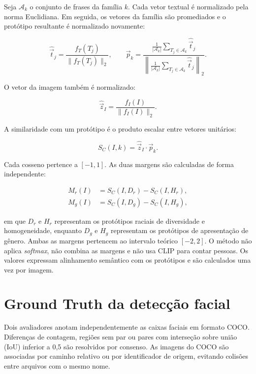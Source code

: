 Seja $\mathcal{A}_k$ o conjunto de frases da família $k$. Cada vetor textual é normalizado pela norma Euclidiana. Em seguida, os vetores da família são promediados e o protótipo resultante é normalizado novamente:

\begin{equation}
\widehat{\vec{t}}_j =
\frac{f_T(T_j)}{\lVert f_T(T_j) \rVert_2},
\qquad
\vec{p}_k =
\frac{\frac{1}{|\mathcal{A}_k|}\sum_{T_j \in \mathcal{A}_k}\widehat{\vec{t}}_j}
{\left\lVert \frac{1}{|\mathcal{A}_k|}\sum_{T_j \in \mathcal{A}_k}\widehat{\vec{t}}_j \right\rVert_2}.
\end{equation}

O vetor da imagem também é normalizado:

\begin{equation}
\widehat{\vec{z}}_I =
\frac{f_I(I)}{\lVert f_I(I) \rVert_2}.
\end{equation}

A similaridade com um protótipo é o produto escalar entre vetores unitários:

\begin{equation}
S_C(I,k) = \widehat{\vec{z}}_I \cdot \vec{p}_k.
\end{equation}

Cada cosseno pertence a $[-1,1]$. As duas margens são calculadas de forma independente:

\begin{align}
M_r(I) &= S_C(I,D_r) - S_C(I,H_r), \\
M_g(I) &= S_C(I,D_g) - S_C(I,H_g),
\end{align}

\noindent em que $D_r$ e $H_r$ representam os protótipos raciais de diversidade e homogeneidade, enquanto $D_g$ e $H_g$ representam os protótipos de apresentação de gênero. Ambas as margens pertencem ao intervalo teórico $[-2,2]$. O método não aplica \textit{softmax}, não combina as margens e não usa CLIP para contar pessoas. Os valores expressam alinhamento semântico com os protótipos e são calculados uma vez por imagem.

\section{Ground Truth da detecção facial}

Dois avaliadores anotam independentemente as caixas faciais em formato COCO. Diferenças de contagem, regiões sem par ou pares com interseção sobre união (IoU) inferior a 0,5 são resolvidos por consenso. As imagens do COCO são associadas por caminho relativo ou por identificador de origem, evitando colisões entre arquivos com o mesmo nome.

